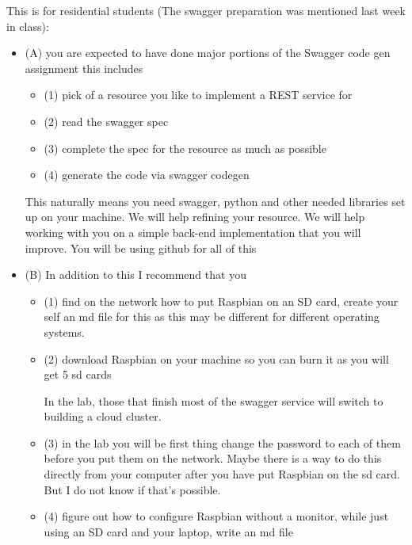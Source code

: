 \begin{exercise}
  This is for residential students (The swagger preparation was
  mentioned last week in class):

 \begin{itemize}

 \item (A) you are expected to have done major portions of the Swagger
   code gen assignment this includes

  \begin{itemize}
  \item (1) pick of a resource you like to implement a REST service
    for
  \item (2) read the swagger spec
  \item (3) complete the spec for the resource as much as possible
  \item (4) generate the code via swagger codegen
  \end{itemize}

  This naturally means you need swagger, python and other needed
  libraries set up on your machine. We will help refining your
  resource. We will help working with you on a simple back-end
  implementation that you will improve. You will be using github for
  all of this

\item (B) In addition to this I recommend that you

  \begin{itemize}

  \item (1) find on the network how to put Raspbian on an SD card,
    create your self an md file for this as this may be different for
    different operating systems.

 
  \item (2) download Raspbian on your machine so you can burn it as you
    will get 5 sd cards
 
    In the lab, those that finish most of the swagger service will
    switch to building a cloud cluster.
 
  \item (3) in the lab you will be first thing change the password to
    each of them before you put them on the network. Maybe there is a
    way to do this directly from your computer after you have put
    Raspbian on the sd card. But I do not know if that's possible.

 
  \item (4) figure out how to configure Raspbian without a monitor,
    while just using an SD card and your laptop, write an md file


\end{itemize}
\end{itemize}
\end{exercise}
